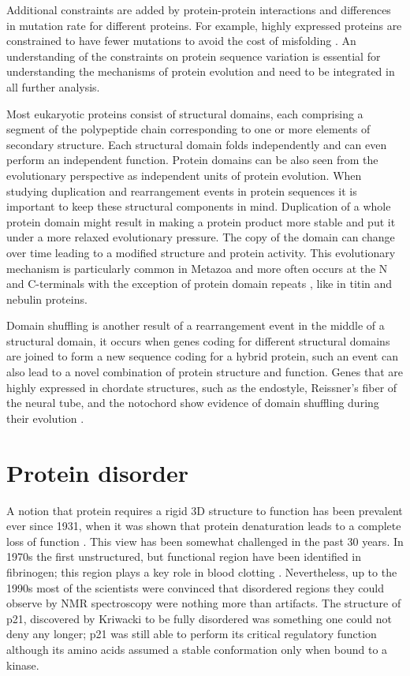 \documentclass[11pt, a4paper,oneside]{report}
\begin{document}
Additional constraints are added by protein-protein interactions \cite{Park2001} and differences in mutation rate for different proteins. For example, highly expressed proteins are constrained to have fewer mutations to avoid the cost of misfolding \cite{Subramanian2004}. An understanding of the constraints on protein sequence variation is essential for understanding the mechanisms of protein evolution and need to be integrated in all further analysis. 

Most eukaryotic proteins consist of structural domains, each comprising a segment of the polypeptide chain corresponding to one or more elements of secondary structure. Each structural domain folds independently and can even perform an independent function. Protein domains can be also seen from the evolutionary perspective as independent units of protein evolution. When studying duplication and rearrangement events in protein sequences it is important to keep these structural components in mind. Duplication of a whole protein domain might result in making a protein product more stable and put it under a more relaxed evolutionary pressure. The copy of the domain can change over time leading to a modified structure and protein activity. This evolutionary mechanism is particularly common in Metazoa and more often occurs at the N and C-terminals with the exception of protein domain repeats \cite{Bjorklund2006,Bjorklund2005}, like in titin \cite{Higgins1994} and nebulin \cite{Bjorklund2010} proteins. 

 Domain shuffling is another result of a rearrangement event in the middle of a structural domain, it occurs when genes coding for different structural domains are joined  to form a new sequence coding for a hybrid protein, such an event can also lead to a novel combination of protein structure and function. Genes that are highly expressed in chordate structures, such as the endostyle, Reissner's fiber of the neural tube, and the notochord show evidence of domain shuffling during their evolution \cite{Kawashima2009}.
 
\section{Protein disorder}
A notion that protein requires a rigid 3D structure to function has been prevalent ever since 1931, when it was shown that protein denaturation leads to a complete loss of function \cite{Wu1995}. This view has been somewhat challenged in the past 30 years. In 1970s the first unstructured, but functional region have been identified in fibrinogen; this region plays a key role in blood clotting \cite{Doolittle1973}.  Nevertheless, up to the 1990s most of the scientists were convinced that disordered regions they could observe by NMR spectroscopy were nothing more than artifacts. The structure of p21, discovered by Kriwacki\cite{Kriwacki1996}  to be fully disordered was something one could not deny any longer; p21 was still able to perform its critical regulatory function although its amino acids assumed a stable conformation only when bound to a kinase. 
 
\end{document}
